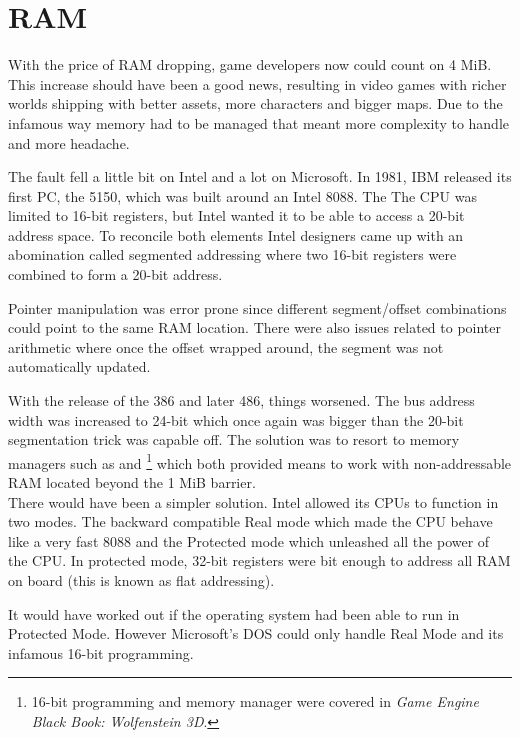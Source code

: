 \section{RAM}
With the price of RAM dropping, game developers now could count on 4 MiB. This increase should have been a good news, resulting in video games with richer worlds shipping with better assets, more characters and bigger maps. Due to the infamous way memory had to be managed that meant more complexity to handle and more headache.\\
\par
The fault fell a little bit on Intel and a lot on Microsoft. In 1981, IBM released its first PC, the 5150,  which was built around an Intel 8088. The The CPU was limited to 16-bit registers, but Intel wanted it to be able to access a 20-bit address space. To reconcile both elements Intel designers came up with an abomination called segmented addressing where two 16-bit registers were combined to form a 20-bit address.\\
\par


\par
Pointer manipulation was error prone since different segment/offset combinations could point to the same RAM location. There were also issues related to pointer arithmetic where once the offset wrapped around, the segment was not automatically updated.\\
\par
With the release of the 386 and later 486, things worsened. The bus address width was increased to 24-bit which once again was bigger than the 20-bit segmentation trick was capable off. The solution was to resort to memory managers such as  and \footnote{16-bit programming and memory manager were covered in \textit{Game Engine Black Book: Wolfenstein 3D}.} which both provided means to work with non-addressable RAM located beyond the 1 MiB barrier.\\

There would have been a simpler solution. Intel allowed its CPUs to function in two modes. The backward compatible Real mode which made the CPU behave like a very fast 8088 and the Protected mode which unleashed all the power of the CPU. In protected mode, 32-bit registers were bit enough to address all RAM on board (this is known as flat addressing).\\
\par
It would have worked out if the operating system had been able to run in Protected Mode. However Microsoft's DOS could only handle Real Mode and its infamous 16-bit programming.\\ 
\par




